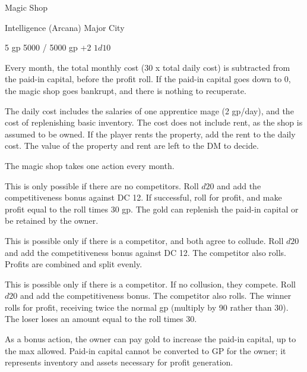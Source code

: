 \documentclass[twocolumn]{dndbook}
\begin{document}
\begin{DndMonster}[width=.5\textwidth - 8pt]{Magic Shop}

	\hfill Intelligence (Arcana)
	\hfill Major City

	\hfill 5 gp
	\hfill 5000 / 5000 gp
	\hfill +2
	\hfill $1d10$

	Every month, the total monthly cost (30 x total daily cost) is subtracted
	from the paid-in capital, before the profit roll.
	If the paid-in capital goes down to 0, the magic shop goes bankrupt,
	and there is nothing to recuperate.\par

	The daily cost includes the salaries of one apprentice mage (2 gp/day),
	and the cost of replenishing basic inventory.
	The cost does not include rent, as the shop is assumed to be owned.
	If the player rents the property, add the rent to the daily cost.
	The value of the property and rent are left to the DM to decide.\par

	The magic shop takes one action every month.

	This is only possible if there are no competitors.
	Roll $d20$ and add the competitiveness bonus against DC 12.
	If successful, roll for profit, and make profit equal to the roll
	times 30 gp. The gold can replenish the paid-in capital or be retained by the owner.

	This is possible only if there is a competitor, and both agree to collude.
	Roll $d20$ and add the competitiveness bonus against DC 12.
	The competitor also rolls. Profits are combined and split evenly.

	This is possible only if there is a competitor. If no collusion, they compete.
	Roll $d20$ and add the competitiveness bonus.
	The competitor also rolls.
	The winner rolls for profit, receiving twice the normal gp (multiply by 90 rather than 30).
	The loser loses an amount equal to the roll times 30.

	As a bonus action, the owner can pay gold to increase
	the paid-in capital, up to the max allowed.
	Paid-in capital cannot be converted to GP for the owner; it represents inventory and assets necessary for profit generation.
\end{DndMonster}
\end{document}
